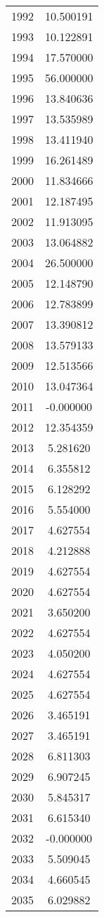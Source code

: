 \documentclass[12pt]{article}
\begin{document}
\begin{longtable}{@{}cc@{}}
1992 & 10.500191 \\
1993 & 10.122891 \\
1994 & 17.570000 \\
1995 & 56.000000 \\
1996 & 13.840636 \\
1997 & 13.535989 \\
1998 & 13.411940 \\
1999 & 16.261489 \\
2000 & 11.834666 \\
2001 & 12.187495 \\
2002 & 11.913095 \\
2003 & 13.064882 \\
2004 & 26.500000 \\
2005 & 12.148790 \\
2006 & 12.783899 \\
2007 & 13.390812 \\
2008 & 13.579133 \\
2009 & 12.513566 \\
2010 & 13.047364 \\
2011 & -0.000000 \\
2012 & 12.354359 \\
2013 & 5.281620 \\
2014 & 6.355812 \\
2015 & 6.128292 \\
2016 & 5.554000 \\
2017 & 4.627554 \\
2018 & 4.212888 \\
2019 & 4.627554 \\
2020 & 4.627554 \\
2021 & 3.650200 \\
2022 & 4.627554 \\
2023 & 4.050200 \\
2024 & 4.627554 \\
2025 & 4.627554 \\
2026 & 3.465191 \\
2027 & 3.465191 \\
2028 & 6.811303 \\
2029 & 6.907245 \\
2030 & 5.845317 \\
2031 & 6.615340 \\
2032 & -0.000000 \\
2033 & 5.509045 \\
2034 & 4.660545 \\
2035 & 6.029882 \\

\end{longtable}
\end{document}
